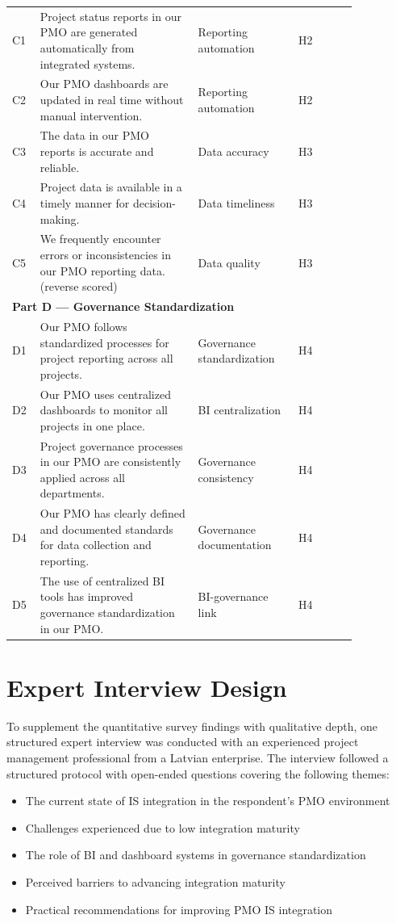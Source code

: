 {\begin{longtable}{p{0.05\linewidth}p{0.40\linewidth}p{0.25\linewidth}p{0.15\linewidth}}
  C1 & Project status reports in our PMO are generated
  automatically from integrated systems. & Reporting automation & H2\\
  C2 & Our PMO dashboards are updated in real time without
  manual intervention. & Reporting automation & H2\\
  C3 & The data in our PMO reports is accurate and reliable. &
  Data accuracy & H3\\
  C4 & Project data is available in a timely manner for
  decision-making. & Data timeliness & H3\\
  C5 & We frequently encounter errors or inconsistencies in
  our PMO reporting data. (reverse scored) & Data quality & H3\\
  \midrule
  \multicolumn{4}{l}{\textbf{Part D --- Governance Standardization}}\\
  D1 & Our PMO follows standardized processes for project
  reporting across all projects. & Governance standardization & H4\\
  D2 & Our PMO uses centralized dashboards to monitor all
  projects in one place. & BI centralization & H4\\
  D3 & Project governance processes in our PMO are consistently
  applied across all departments. & Governance consistency & H4\\
  D4 & Our PMO has clearly defined and documented standards
  for data collection and reporting. & Governance documentation & H4\\
  D5 & The use of centralized BI tools has improved governance
  standardization in our PMO. & BI-governance link & H4\\
\end{longtable}
}

\section{Expert Interview Design}
\label{sec:interviews-design}

To supplement the quantitative survey findings with qualitative depth,
one structured expert interview was conducted with an experienced project
management professional from a Latvian enterprise. The interview followed
a structured protocol with open-ended questions covering the following themes:

\begin{itemize}
    \item The current state of IS integration in the respondent's PMO environment
    \item Challenges experienced due to low integration maturity
    \item The role of BI and dashboard systems in governance standardization
    \item Perceived barriers to advancing integration maturity
    \item Practical recommendations for improving PMO IS integration
\end{itemize}

